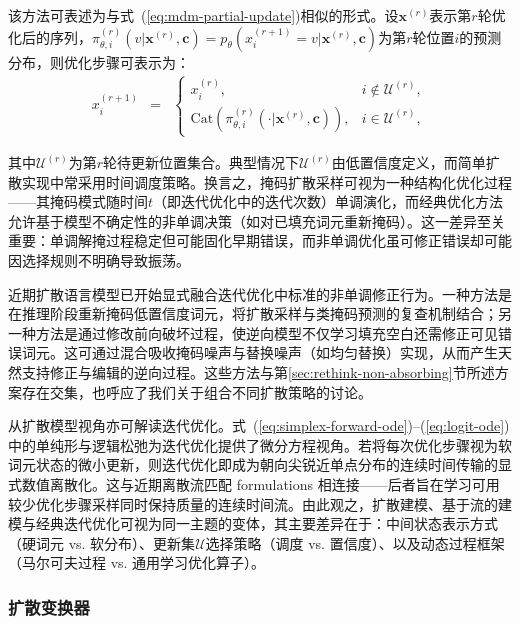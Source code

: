\documentclass[UTF8,a4paper,zihao=-4,oneside,openany]{ctexbook}
\begin{document}
该方法可表述为与式~(\ref{eq:mdm-partial-update})相似的形式。设$\mathbf{x}^{(r)}$表示第$r$轮优化后的序列，$\pi_{\theta,i}^{(r)}(v | \mathbf{x}^{(r)},\mathbf{c})=p_{\theta}(x_i^{(r+1)} = v | \mathbf{x}^{(r)},\mathbf{c})$为第$r$轮位置$i$的预测分布，则优化步骤可表示为：
\begin{eqnarray}
x_i^{(r+1)} & = &
\begin{cases}
x_i^{(r)}, & i\notin \mathcal{U}^{(r)},\\
\mathrm{Cat}\left(\pi^{(r)}_{\theta,i}(\cdot | \mathbf{x}^{(r)},\mathbf{c})\right), & i\in \mathcal{U}^{(r)},
\end{cases}
\label{eq:iterref-update}
\end{eqnarray}

\noindent 其中$\mathcal{U}^{(r)}$为第$r$轮待更新位置集合。典型情况下$\mathcal{U}^{(r)}$由低置信度定义，而简单扩散实现中常采用时间调度策略。换言之，掩码扩散采样可视为一种结构化优化过程——其掩码模式随时间$t$（即迭代优化中的迭代次数）单调演化，而经典优化方法允许基于模型不确定性的非单调决策（如对已填充词元重新掩码）。这一差异至关重要：单调解掩过程稳定但可能固化早期错误，而非单调优化虽可修正错误却可能因选择规则不明确导致振荡。

近期扩散语言模型已开始显式融合迭代优化中标准的非单调修正行为。一种方法是在推理阶段重新掩码低置信度词元，将扩散采样与类掩码预测的复查机制结合\citep{koh-etal:2025conditional,zhang-etal:2025corrective}；另一种方法是通过修改前向破坏过程，使逆向模型不仅学习填充空白还需修正可见错误词元。这可通过混合吸收掩码噪声与替换噪声（如均匀替换）实现，从而产生天然支持修正与编辑的逆向过程\citep{rutte-etal:2025generalized}。这些方法与第\ref{sec:rethink-non-absorbing}节所述方案存在交集，也呼应了我们关于组合不同扩散策略的讨论。

从扩散模型视角亦可解读迭代优化。式~(\ref{eq:simplex-forward-ode})--(\ref{eq:logit-ode})中的单纯形与逻辑松弛为迭代优化提供了微分方程视角。若将每次优化步骤视为软词元状态的微小更新，则迭代优化即成为朝向尖锐近单点分布的连续时间传输的显式数值离散化。这与近期离散流匹配 formulations 相连接——后者旨在学习可用较少优化步骤采样同时保持质量的连续时间流\citep{gat-etal:2024discrete,monsefi-etal:2025fs}。由此观之，扩散建模、基于流的建模与经典迭代优化可视为同一主题的变体，其主要差异在于：中间状态表示方式（硬词元 vs. 软分布）、更新集$\mathcal{U}$选择策略（调度 vs. 置信度）、以及动态过程框架（马尔可夫过程 vs. 通用学习优化算子）。
\subsubsection{扩散变换器}
\end{document}

